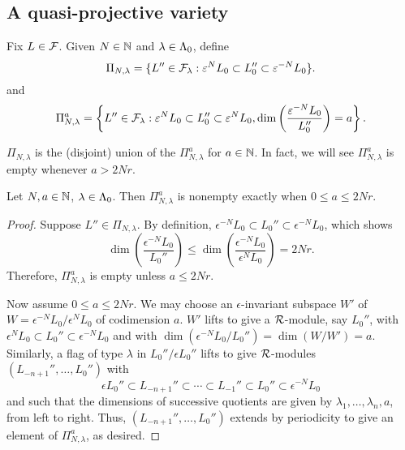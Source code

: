 \documentclass[a4paper, 11pt]{report}
\begin{document}
\subsection{A quasi-projective variety}

Fix $L\in\mathcal{F}$. Given $N\in\mathbb{N}$ and $\lambda\in{\Lambda_0}$, define
\begin{equation*}
\Pi_{N,\lambda} = \{L''\in\mathcal{F}_\lambda: \varepsilon^N L_0\subset L_0''\subset \varepsilon^{-N}L_0\}.
\end{equation*}
and
\begin{equation*}
\Pi_{N,\lambda}^a = \left\{L''\in\mathcal{F}_\lambda: \varepsilon^N L_0\subset L_0''\subset \varepsilon^{N}L_0, \dim\left(\frac{\varepsilon^{-N}L_0}{L_0''}\right) = a\right\}.
\end{equation*}

$\Pi_{N,\lambda}$ is the (disjoint) union of the $\Pi_{N,\lambda}^a$ for $a\in\mathbb{N}$. In fact, we will see $\Pi_{N,\lambda}^a$ is empty whenever $a > 2Nr$.

\begin{lemma}
Let $N,a\in\mathbb{N}$, $\lambda\in{\Lambda_0}$. Then $\Pi_{N,\lambda}
^a$ is nonempty exactly when $0\le a \le 2Nr$.
\end{lemma}

\begin{proof}
Suppose $L''\in\Pi_{N,\lambda}$. By definition, $\epsilon^{-N}L_0\subset L_0''\subset \epsilon^{-N}L_0$, which shows
\begin{equation*}
\dim\left(\frac{\epsilon^{-N}L_0}{L_0''}\right) \le \dim\left(\frac{\epsilon^{-N}L_0}{\epsilon^N L_0}\right) = 2Nr.
\end{equation*}
Therefore, $\Pi_{N,\lambda}^a$ is empty unless $a\le 2Nr$.

Now assume $0\le a\le 2Nr$. We may choose an $\epsilon$-invariant subspace $W'$ of $W = \epsilon^{-N}L_0/{\epsilon^N L_0}$ of codimension $a$. $W'$ lifts to give a $\mathcal{R}$-module, say $L_0''$, with $\epsilon^N L_0\subset L_0''\subset \epsilon^{-N}L_0$ and with $\dim(\epsilon^{-N}L_0/{L_0''}) = \dim(W/W') = a$. Similarly, a flag of type $\lambda$ in $L_0''/{\epsilon L_0''}$ lifts to give $\mathcal{R}$-modules $(L_{-n+1}'',\ldots,L_0'')$ with
\begin{equation*}
\epsilon L_0''\subset L_{-n+1}''\subset\cdots\subset L_{-1}''\subset L_0''\subset \epsilon^{-N}L_0
\end{equation*}
and such that the dimensions of successive quotients are given by $\lambda_1,\ldots,\lambda_n,a$, from left to right. Thus, $(L_{-n+1}'',\ldots,L_0'')$ extends by periodicity to give an element of $\Pi_{N,\lambda}^a$, as desired.
\end{proof}
\end{document}
